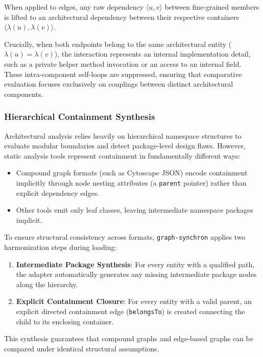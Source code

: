 When applied to edges, any raw dependency $\langle u, v \rangle$
between fine-grained members is lifted to an architectural dependency
between their respective containers $\langle \lambda(u), \lambda(v) \rangle$.

Crucially, when both endpoints belong to the same architectural
entity ($\lambda(u) = \lambda(v)$), the interaction represents an
internal implementation detail, such as a private helper method
invocation or an access to an internal field. These intra-component
self-loops are suppressed, ensuring that comparative evaluation
focuses exclusively on couplings between distinct architectural components.

\subsubsection{Hierarchical Containment Synthesis}
\label{subsec:structural_closure}

Architectural analysis relies heavily on hierarchical namespace
structures to evaluate modular boundaries and detect package-level
design flaws. However, static analysis tools represent containment in
fundamentally different ways:
\begin{itemize}
  \item Compound graph formats (such as Cytoscape JSON) encode
    containment implicitly through node nesting attributes (a
    \texttt{parent} pointer) rather than explicit dependency edges.
  \item Other tools emit only leaf classes, leaving intermediate
    namespace packages implicit.
\end{itemize}

To ensure structural consistency across formats,
\texttt{graph-synchron} applies two harmonization steps during loading:
\begin{enumerate}
  \item \textbf{Intermediate Package Synthesis}: For every entity
    with a qualified path, the adapter automatically generates any
    missing intermediate package nodes along the hierarchy.
  \item \textbf{Explicit Containment Closure}: For every entity with
    a valid parent, an explicit directed containment edge
    (\texttt{belongsTo}) is created connecting the child to its
    enclosing container.
\end{enumerate}
This synthesis guarantees that compound graphs and edge-based graphs
can be compared under identical structural assumptions.

